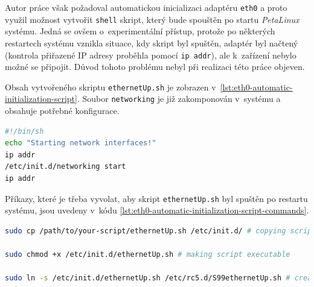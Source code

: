 \documentclass[a4paper, twoside, 11pt]{article}
\newcommand{\fbar}{\FloatBarrier}
\begin{document}
	Autor práce však požadoval automatickou inicializaci adaptéru \texttt{eth0} a proto využil možnost vytvořit \texttt{shell} skript, který bude spouštěn po startu \textit{PetaLinux} systému. Jedná se ovšem o~experimentální přístup, protože po některých restartech systému vznikla situace, kdy skript byl spuštěn, adaptér byl načtený (kontrola přiřazené IP adresy proběhla pomocí \texttt{ip addr}), ale k~zařízení nebylo možné se připojit. Důvod tohoto problému nebyl při realizaci této práce objeven.\par
	Obsah vytvořeného skriptu \texttt{ethernetUp.sh} je zobrazen v~\ref{lst:eth0-automatic-initialization-script}. Soubor \texttt{networking} je již zakomponován v~systému a obsahuje potřebné konfigurace.\par

	\begin{lstlisting}[language={sh}, caption={Skript pro automatickou inicializaci adaptéru eth0.}, label={lst:eth0-automatic-initialization-script}, morekeywords={}]
#!/bin/sh		
echo "Starting network interfaces!"
ip addr
/etc/init.d/networking start
ip addr\end{lstlisting}

	Příkazy, které je třeba vyvolat, aby skript \texttt{ethernetUp.sh} byl spuštěn po restartu systému, jsou uvedeny v~kódu \ref{lst:eth0-automatic-initialization-script-commands}.

\begin{lstlisting}[language={sh}, caption={Skript pro automatickou inicializaci adaptéru eth0.}, label={lst:eth0-automatic-initialization-script-commands}, morekeywords={}]
sudo cp /path/to/your-script/ethernetUp.sh /etc/init.d/ # copying script to init.d directory

sudo chmod +x /etc/init.d/ethernetUp.sh # making script executable

sudo ln -s /etc/init.d/ethernetUp.sh /etc/rc5.d/S99ethernetUp.sh # creating soft symbolic link to a script in the folder rc5.d which represents layer, when the script should be run\end{lstlisting}


	\fbar
\end{document}
